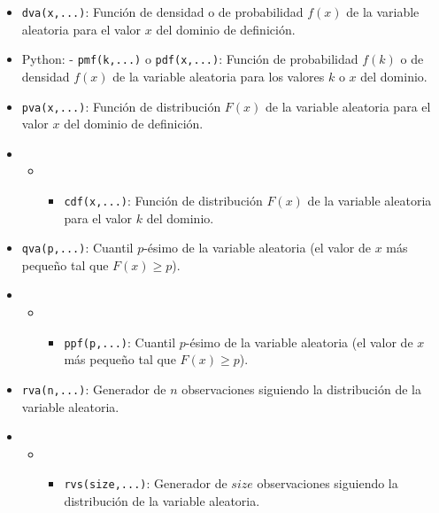 \documentclass[
]{article}
\providecommand{\tightlist}{%
  \setlength{\itemsep}{0pt}\setlength{\parskip}{0pt}}
\begin{document}
\begin{itemize}
\item
  \texttt{dva(x,...)}: Función de densidad o de probabilidad \(f(x)\) de
  la variable aleatoria para el valor \(x\) del dominio de definición.
\item
  Python: - \texttt{pmf(k,...)} o \texttt{pdf(x,...)}: Función de
  probabilidad \(f(k)\) o de densidad \(f(x)\) de la variable aleatoria
  para los valores \(k\) o \(x\) del dominio.
\item
  \texttt{pva(x,...)}: Función de distribución \(F(x)\) de la variable
  aleatoria para el valor \(x\) del dominio de definición.
\item
  \begin{itemize}
  \item
    \begin{itemize}
    \tightlist
    \item
      \texttt{cdf(x,...)}: Función de distribución \(F(x)\) de la
      variable aleatoria para el valor \(k\) del dominio.
    \end{itemize}
  \end{itemize}
\item
  \texttt{qva(p,...)}: Cuantil \(p\)-ésimo de la variable aleatoria (el
  valor de \(x\) más pequeño tal que \(F(x)\geq p\)).
\item
  \begin{itemize}
  \item
    \begin{itemize}
    \tightlist
    \item
      \texttt{ppf(p,...)}: Cuantil \(p\)-ésimo de la variable aleatoria
      (el valor de \(x\) más pequeño tal que \(F(x)\geq p\)).
    \end{itemize}
  \end{itemize}
\item
  \texttt{rva(n,...)}: Generador de \(n\) observaciones siguiendo la
  distribución de la variable aleatoria.
\item
  \begin{itemize}
  \item
    \begin{itemize}
    \tightlist
    \item
      \texttt{rvs(size,...)}: Generador de \(size\) observaciones
      siguiendo la distribución de la variable aleatoria.
    \end{itemize}
  \end{itemize}
\end{itemize}
\end{document}
